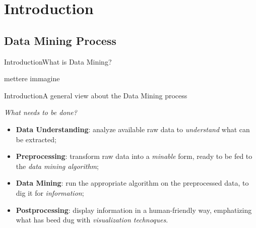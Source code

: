 \section{Introduction}
\subsection{Data Mining Process}
\begin{frame}{Introduction}{What is Data Mining?}

\huge{mettere immagine}

\end{frame}

\begin{frame}{Introduction}{A general view about the Data Mining process}

    \centering\textit{What needs to be done?} \vspace{0,3cm}

	\begin{block}{}
		\begin{itemize}
			\item<1-> \textbf{Data Understanding}: analyze available raw data to \emph{understand} what can be extracted;
			\item<2-> \textbf{Preprocessing}: transform raw data into a \emph{minable} form, ready to be fed to the \emph{data mining algorithm};
			\item<3-> \textbf{Data Mining}: run the appropriate algorithm on the preprocessed data, to dig it for \emph{information};
			\item<4-> \textbf{Postprocessing}: display information in a human-friendly way, emphatizing what has beed dug with \emph{visualization technoques}.
		\end{itemize}
	\end{block}

\end{frame}

